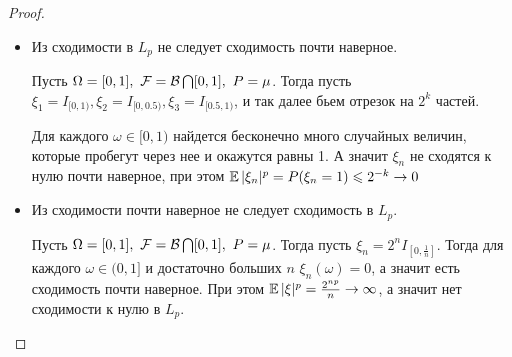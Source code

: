 \begin{proof}
\begin{itemize}
        Пусть $\eps > 0, \delta > 0$. Найдем такое $k$, что $\delta > \frac{1}{2^k}$, тогда $\forall n \geqslant 2^k \ P(|\xi_n| > \eps) \leqslant \frac{1}{2^k} < \delta$.
        
        Для каждого $\omega \in [0, 1)$ найдется бесконечно много случайных величин, которые пробегут через нее и окажутся больше 1. А значит $\xi_n$ не сходятся к нулю почти наверное.
        
        $\forall n \geqslant 2^k \ \E|\xi_n|^p = 2^{np - \lfloor log_2\:n\rfloor} \geqslant 2^{2^k - k} \to \infty$, а значит не сходится к нулю.
        
        \item Из сходимости в $L_p$ не следует сходимость почти наверное. 
        
        Пусть $\Omega = [0, 1],\  \mathcal{F} = \mathcal{B} \bigcap [0, 1],\  P = \mu$. Тогда пусть $\xi_1 = I_{[0, 1)}, \xi_2 = I_{[0, 0.5)}, \xi_3 = I_{[0.5, 1)}$, и так далее бьем отрезок на $2^k$ частей.
        
        Для каждого $\omega \in [0, 1)$ найдется бесконечно много случайных величин, которые пробегут через нее и окажутся равны 1. А значит $\xi_n$ не сходятся к нулю почти наверное, при этом $\operatorname{\mathbb{E}}|\xi_n|^p = P(\xi_n = 1) \leqslant 2^{-k} \to 0$
        
        \item Из сходимости почти наверное не следует сходимость в $L_p$.
        
        Пусть $\Omega = [0, 1],\  \mathcal{F} = \mathcal{B} \bigcap [0, 1], \ P = \mu$. Тогда пусть $\xi_n = 2^{n}I_{[0, \frac{1}{n}]}$. Тогда для каждого $\omega \in (0, 1]$ и достаточно больших $n$ $\xi_n(\omega) = 0$, а значит есть сходимость почти наверное. При этом $\operatorname{\mathbb{E}}|\xi|^p = \frac{2^{np}}{n} \to \infty$, а значит нет сходимости к нулю в $L_p$.  
    \end{itemize}
\end{proof}
